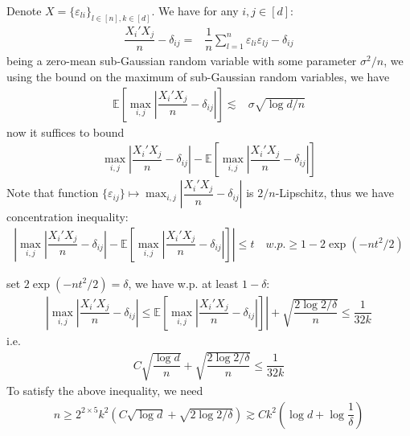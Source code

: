 \documentclass[11pt,a4paper]{ctexart}
\numberwithin{equation}{section}%
\begin{document}
Denote $ X = \{\varepsilon _{li}\}_{l\in [n], k\in [d]} $. We have for any $ i,j\in [d] $:
\begin{align*}
     \dfrac{ X_i'X_j  }{ n } - \delta _{ij} = & \dfrac{ 1 }{ n } \sum_{l=1}^{n} \varepsilon _{li}\varepsilon _{lj} - \delta _{ij} 
\end{align*}
being a zero-mean sub-Gaussian random variable with some parameter $ \sigma ^2/n $, we using the bound on the maximum of sub-Gaussian random variables, we have
\begin{align*}
    \mathbb{E}\left[ \max_{i,j} \left\vert \dfrac{ X_i'X_j  }{ n } - \delta _{ij} \right\vert  \right]  \lesssim & \sigma \sqrt{ \log d/n }
\end{align*}
now it suffices to bound 
\begin{align*}
    \max_{i,j} \left\vert \dfrac{ X_i'X_j  }{ n } - \delta _{ij} \right\vert  - \mathbb{E}\left[ \max_{i,j} \left\vert \dfrac{ X_i'X_j  }{ n } - \delta _{ij} \right\vert  \right]
\end{align*}
Note that function $ \{\varepsilon _{ij}\} \mapsto \max_{i,j} \left\vert \dfrac{ X_i'X_j  }{ n } - \delta _{ij} \right\vert $ is $ 2/n $-Lipschitz, thus we have concentration inequality:
\begin{align*}
    \left\vert \max_{i,j} \left\vert \dfrac{ X_i'X_j  }{ n } - \delta _{ij} \right\vert  - \mathbb{E}\left[ \max_{i,j} \left\vert \dfrac{ X_i'X_j  }{ n } - \delta _{ij} \right\vert  \right]  \right\vert \leq t \quad w.p. \geq 1-2\exp(-nt^2/2)
\end{align*}

set $ 2\exp (-nt^2/2) = \delta  $, we have w.p. at least $ 1-\delta $:
\begin{align*}
    \left\vert \max_{i,j} \left\vert \dfrac{ X_i'X_j  }{ n } - \delta _{ij} \right\vert \leq  \mathbb{E}\left[ \max_{i,j} \left\vert \dfrac{ X_i'X_j  }{ n } - \delta _{ij} \right\vert  \right]  \right\vert + \sqrt{\dfrac{ 2\log 2/\delta  }{ n } } \leq \dfrac{ 1 }{ 32k }  
\end{align*}
i.e.
\begin{align*}
    C\sqrt{\dfrac{ \log d }{ n  }} + \sqrt{\dfrac{ 2\log 2/\delta  }{ n } } \leq \dfrac{ 1 }{ 32k } 
\end{align*}
To satisfy the above inequality, we need 
\begin{align*}
    n\geq 2^{2\times 5}k^2(C\sqrt{\log d} + \sqrt{2\log 2/\delta}) \gtrsim  Ck^2(\log d + \log \dfrac{ 1 }{ \delta  } ) 
\end{align*}
\end{document}
